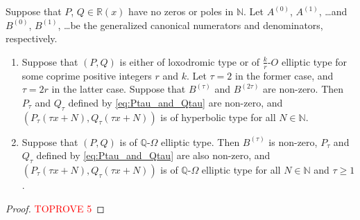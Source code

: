 \documentclass[a4paper,UKenglish,cleveref,autoref,thm-restate]{lipics-v2021}
\newcommand{\R}{\mathbb{R}}
\newcommand{\N}{\mathbb{N}}
\newcommand{\Q}{\mathbb{Q}}
\begin{document}
\begin{corollary}
\label{cor:hyperbolic subsequence}
Suppose that $P$, $Q \in \R (x)$ have no zeros or poles in $\N$.
Let $A^{(0)}$, $A^{(1)}$, \dots and $B^{(0)}$, $B^{(1)}$, \dots be the generalized canonical numerators and denominators, respectively. 
\begin{enumerate}[(1)]
\item \label{item:lox_or_k/r-O_elliptic->hyepr} 
Suppose that 
$(P, Q)$ is either of loxodromic type
or of $\frac k r$-$O$ elliptic type for some coprime positive integers $r$ and $k$.
Let $\tau = 2$ in the former case,
and $\tau = 2 r$ in the latter case. 
Suppose that $B ^{(\tau)}$ and $B ^{(2 \tau)}$ are non-zero. 
Then 
$P _\tau$ and $Q _\tau$ defined by \eqref{eq:Ptau_and_Qtau} are non-zero, 
and $(P _\tau (\tau x + N), Q _\tau (\tau x + N))$ is of hyperbolic type for all $N \in \N$.
\item \label{item:Q-Omega_elliptic->Q-Omega_elliptic} 
Suppose that
$(P, Q)$ is of $\Q$-$\Omega$ elliptic type.
Then $B ^{(\tau)}$ is non-zero, $P _\tau$ and $Q _\tau$ defined by \eqref{eq:Ptau_and_Qtau} are also non-zero,
and 
$(P _\tau (\tau x + N), Q _\tau (\tau x + N))$ is of $\Q$-$\Omega$ elliptic type for all $N \in \N$ and $\tau \geq 1$.
\end{enumerate}
\end{corollary}

\begin{proof}\textcolor{red}{TOPROVE 5}\end{proof}
\end{document}
